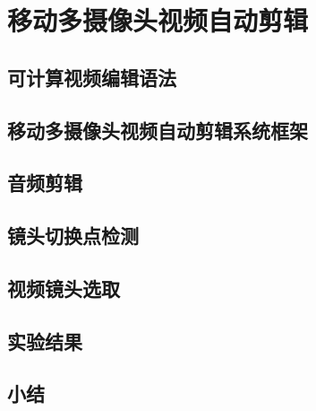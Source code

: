 
\chapter{移动多摄像头视频自动剪辑}
\section{可计算视频编辑语法}
\section{移动多摄像头视频自动剪辑系统框架}
\section{音频剪辑}
\section{镜头切换点检测}
\section{视频镜头选取}
\section{实验结果}
\section{小结}
